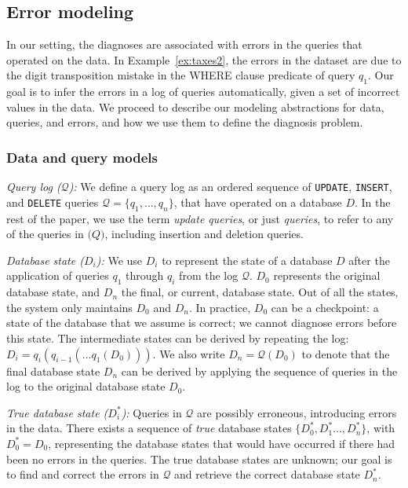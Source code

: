 \subsection{Error modeling}
\label{sec:model}

In our setting, the diagnoses are associated with errors in the queries that
operated on the data. In Example~\ref{ex:taxes2}, the errors in the dataset
are due to the digit transposition mistake in the WHERE clause predicate of
query $q_1$. Our goal is to infer the errors in a log of queries
automatically, given a set of incorrect values in the data. We proceed to
describe our modeling abstractions for data, queries, and errors, and how we
use them to define the diagnosis problem.

\subsubsection*{Data and query models}

\noindent
\emph{Query log ($\mathcal{Q}$):}
We define a query log as an ordered sequence of \texttt{UPDATE}, \texttt{INSERT}, and
\texttt{DELETE} queries $\mathcal{Q}=\{q_1,\dots,q_n\}$, that have
operated on a database $D$. In the rest of the paper, we use the term
\emph{update queries}, or just \emph{queries}, to refer to any of the queries in $\mathcal(Q)$,
including insertion and deletion queries.

\smallskip
\noindent
\emph{Database state ($D_i$):}
We use $D_i$ to represent the state of a database $D$ after the application of
queries $q_1$ through $q_i$ from the log $\mathcal{Q}$. $D_0$ represents the
original database state, and $D_n$ the final, or current, database state. Out
of all the states, the system only maintains $D_0$ and $D_n$. In practice,
$D_0$ can be a checkpoint: a state of the database that we assume is correct;
we cannot diagnose errors before this state. The intermediate states can be
derived by repeating the log: $D_i=q_i(q_{i-1}(\dots q_1(D_0)))$. We also
write $D_n=\mathcal{Q}(D_0)$ to denote that the final database state $D_n$ can
be derived by applying the sequence of queries in the log to the original
database state $D_0$.

\smallskip
\noindent
\emph{True database state ($D_i^*$):}
Queries in $\mathcal{Q}$ are possibly erroneous, introducing errors in the
data. There exists a sequence of \emph{true} database states $\{D_0^*,
D_1^*\dots, D_n^*\}$, with $D_0^*=D_0$, representing the database states that
would have occurred if there had been no errors in the queries.
The true database states are unknown; our goal is to find and correct the errors in $\mathcal{Q}$ and retrieve the correct database state $D_n^*$.

